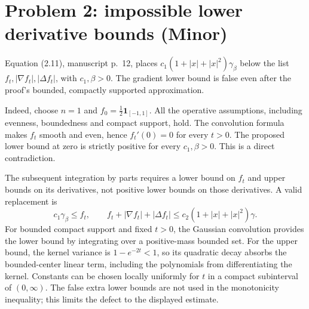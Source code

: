 \documentclass[10pt]{article}
\begin{document}
\section*{Problem 2: impossible lower derivative bounds (Minor)}
Equation (2.11), manuscript p. 12, places \(c_1(1+|x|+|x|^2)\gamma_\beta\) below the list \(f_t,|\nabla f_t|,|\Delta f_t|\), with \(c_1,\beta>0\). The gradient lower bound is false even after the proof’s bounded, compactly supported approximation.\par
Indeed, choose \(n=1\) and \(f_0=\tfrac12\mathbf1_{[-1,1]}\). All the operative assumptions, including evenness, boundedness and compact support, hold. The convolution formula makes \(f_t\) smooth and even, hence \(f_t'(0)=0\) for every \(t>0\). The proposed lower bound at zero is strictly positive for every \(c_1,\beta>0\). This is a direct contradiction.\par
The subsequent integration by parts requires a lower bound on \(f_t\) and upper bounds on its derivatives, not positive lower bounds on those derivatives. A valid replacement is \[c_1\gamma_\beta\leq f_t,\qquad
 f_t+|\nabla f_t|+|\Delta f_t|
       \leq c_2(1+|x|+|x|^2)\gamma .\] For bounded compact support and fixed \(t>0\), the Gaussian convolution provides the lower bound by integrating over a positive-mass bounded set. For the upper bound, the kernel variance is \(1-e^{-2t}<1\), so its quadratic decay absorbs the bounded-center linear term, including the polynomials from differentiating the kernel. Constants can be chosen locally uniformly for \(t\) in a compact subinterval of \((0,\infty)\). The false extra lower bounds are not used in the monotonicity inequality; this limits the defect to the displayed estimate.\par
\end{document}

